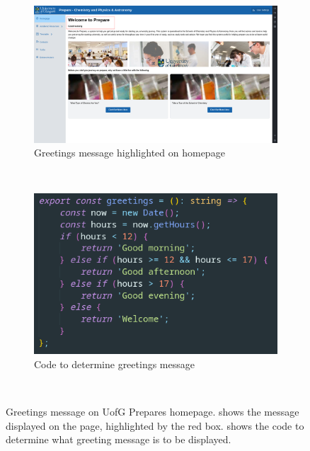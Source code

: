 \documentclass{l4proj}
\begin{document}
\begin{figure}[ht]
    \centering
    \begin{subfigure}[b]{0.9\textwidth}
        \includegraphics[width=\textwidth]{images/greetings_page.pdf}
        \caption{Greetings message highlighted on homepage}
        \label{fig:greet1}
    \end{subfigure}
    ~ %
    \begin{subfigure}[b]{0.6\textwidth}
        \includegraphics[width=\textwidth]{images/greetings_code.pdf}
        \caption{Code to determine greetings message}
        \label{fig:greet2}
    \end{subfigure}
    ~ %
    \caption{Greetings message on UofG Prepares homepage.  shows the message displayed on the page,  highlighted by the red box.  shows the code to determine what greeting message is to be displayed.
    }\label{fig:requirements}
\end{figure}
\end{document}
